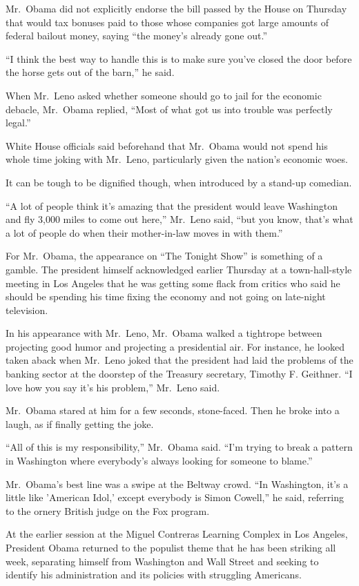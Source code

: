 \documentclass[12pt,a4paper,onecolumn]{article}
\begin{document}
\begin{CJK*}{GBK}{song}
Mr.~Obama did not explicitly endorse the bill passed by the House on Thursday that would tax bonuses
paid to those whose companies got large amounts of federal bailout money, saying ``the money's
already gone out.''

``I think the best way to handle this is to make sure you've closed the door before the horse gets
out of the barn,'' he said.

When Mr.~Leno asked whether someone should go to jail for the economic debacle, Mr.~Obama replied,
``Most of what got us into trouble was perfectly legal.''

White House officials said beforehand that Mr.~Obama would not spend his whole time joking with
Mr.~Leno, particularly given the nation's economic woes.

It can be tough to be dignified though, when introduced by a stand-up comedian.

``A lot of people think it's amazing that the president would leave Washington and fly 3,000 miles
to come out here,'' Mr.~Leno said, ``but you know, that's what a lot of people do when their
mother-in-law moves in with them.''

For Mr.~Obama, the appearance on ``The Tonight Show'' is something of a gamble. The president
himself acknowledged earlier Thursday at a town-hall-style meeting in Los Angeles that he was
getting some flack from critics who said he should be spending his time fixing the economy and not
going on late-night television.

In his appearance with Mr.~Leno, Mr.~Obama walked a tightrope between projecting good humor and
projecting a presidential air. For instance, he looked taken aback when Mr.~Leno joked that the
president had laid the problems of the banking sector at the doorstep of the Treasury secretary,
Timothy F. Geithner. ``I love how you say it's his problem,'' Mr.~Leno said.

Mr.~Obama stared at him for a few seconds, stone-faced. Then he broke into a laugh, as if finally
getting the joke.

``All of this is my responsibility,'' Mr.~Obama said. ``I'm trying to break a pattern in Washington
where everybody's always looking for someone to blame.''

Mr.~Obama's best line was a swipe at the Beltway crowd. ``In Washington, it's a little like
'American Idol,' except everybody is Simon Cowell,'' he said, referring to the ornery British judge
on the Fox program.

At the earlier session at the Miguel Contreras Learning Complex in Los Angeles, President Obama
returned to the populist theme that he has been striking all week, separating himself from
Washington and Wall Street and seeking to identify his administration and its policies with
struggling Americans.


\end{CJK*}
\end{document}

